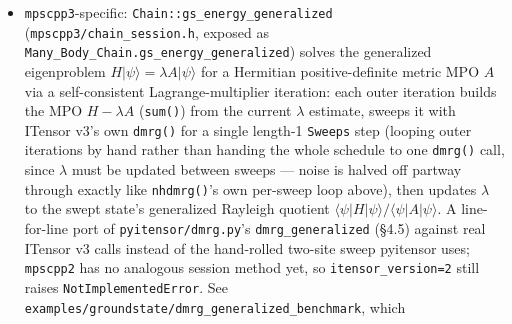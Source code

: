\documentclass[11pt]{article}
\begin{document}
\begin{itemize}
    supports \texttt{+}, \texttt{-}, unary \texttt{-}, and scalar
    \texttt{*}/\texttt{/} between two \texttt{StaticOperator}s (or a
    scalar), on top of the pre-existing \texttt{*} for
    \texttt{StaticOperator*MPS}/\texttt{StaticOperator} contraction.
    \texttt{A + B} (\texttt{Chain::sum\_operators}, a public wrapper each
    backend already had internally as a private \texttt{sum\_mpo()}
    helper used by \texttt{custom\_exp()}/\texttt{evoloperator()}) is a
    compressed direct sum at the tensor-network level --- algorithmically
    the same construction as ITensorMPS.jl's \texttt{+(::MPO, ::MPO)}
    (\texttt{abstractmps.jl}'s default \texttt{"densitymatrix"} algorithm)
    --- not a MultiOperator-level symbolic sum (which already existed, see
    \S4.2, and remains the preferred way to combine Hamiltonians before
    ever building an MPO). It exists for combining operators that only
    exist as already-built \texttt{StaticOperator}s, e.g.\ two
    independently constructed products or exponentials.
    \texttt{"julia\_live"} doesn't implement this yet
    (\texttt{StaticOperator.\_\_add\_\_} raises
    \texttt{NotImplementedError} rather than silently doing something
    backend-specific).
\item \texttt{mpscpp3}-specific: \texttt{Chain::gs\_energy\_generalized}
    (\texttt{mpscpp3/chain\_session.h}, exposed as
    \texttt{Many\_Body\_Chain.gs\_energy\_generalized}) solves the
    generalized eigenproblem $H|\psi\rangle=\lambda A|\psi\rangle$ for a
    Hermitian positive-definite metric MPO $A$ via a self-consistent
    Lagrange-multiplier iteration: each outer iteration builds the MPO
    $H-\lambda A$ (\lstinline|sum()|) from the current $\lambda$
    estimate, sweeps it with ITensor v3's own \lstinline|dmrg()| for a
    single length-1 \lstinline|Sweeps| step (looping outer iterations by
    hand rather than handing the whole schedule to one \lstinline|dmrg()|
    call, since $\lambda$ must be updated between sweeps --- noise is
    halved off partway through exactly like \texttt{nhdmrg()}'s own
    per-sweep loop above), then updates $\lambda$ to the swept state's
    generalized Rayleigh quotient
    $\langle\psi|H|\psi\rangle/\langle\psi|A|\psi\rangle$. A
    line-for-line port of \texttt{pyitensor/dmrg.py}'s
    \texttt{dmrg\_generalized} (\S4.5) against real ITensor v3 calls
    instead of the hand-rolled two-site sweep pyitensor uses;
    \texttt{mpscpp2} has no analogous session method yet, so
    \texttt{itensor\_version=2} still raises
    \texttt{NotImplementedError}. See
    \texttt{examples/groundstate/dmrg\_generalized\_benchmark}, which

\end{itemize}
\end{document}
